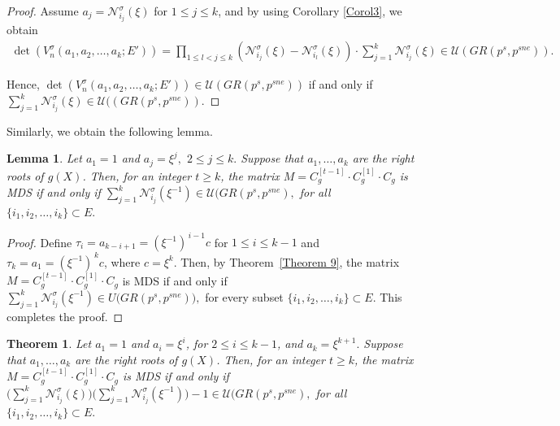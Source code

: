 \documentclass[11pt]{article}
\newtheorem{theorem}{Theorem}
\newtheorem{lemma}{Lemma}
\begin{document}
\begin{proof}
        Assume $a_{j}=\mathcal{N}^\sigma_{i_j}(\xi)$ for $1\leq j \leq k$, and by using Corollary \ref{Corol3}, we obtain 
        \begin{eqnarray*}
            \det( V^\sigma_n(a_1,a_2,\dots,a_k;E'))=\prod_{1\leq l<j\leq k}(\mathcal{N}^\sigma_{i_j}(\xi)- \mathcal{N}^\sigma_{i_l}(\xi))\cdot \sum_{j=1}^{k}\mathcal{N}^\sigma_{i_j}(\xi)\in \mathcal{U}(GR(p^s,p^{sne})).
        \end{eqnarray*}
        
        Hence, $\det( V^\sigma_n(a_1,a_2,\dots,a_k;E'))\in \mathcal{U}(GR(p^s,p^{sne}))$ if and only if $\sum_{j=1}^{k}\mathcal{N}^\sigma_{i_j}(\xi)\in \mathcal{U}((GR(p^s,p^{sne})).$
    \end{proof}
    
    Similarly, we obtain the following lemma.
    \begin{lemma}
        Let $a_1=1$ and $a_j=\xi^j,$ $2\leq j \leq k.$ Suppose that $a_1, \dots, a_k$ are the right roots of $g(X)$. Then, for an integer $t\geq k$, the matrix $
 	M = C^{[t-1]}_g \cdot C^{[1]}_g \cdot C_g
 	$ is MDS if and only if $\sum_{j=1}^{k}\mathcal{N}^\sigma_{i_j}(\xi^{-1}) \in \mathcal{U}(GR(p^s,p^{sne}),$ for all $\{i_1,i_2,\dots,i_k\}\subset E.$ 
    \end{lemma}
    \begin{proof}
       Define $\tau_i=a_{k-i+1}=(\xi^{-1})^{\,i-1}c$ for $1\leq i \leq k-1$ and $\tau_k=a_1=(\xi^{-1})^{\,k}c$, where $c=\xi^k$. Then, by Theorem~\ref{Theorem 9}, the matrix 
\(
M = C^{[t-1]}_g \cdot C^{[1]}_g \cdot C_g
\)
is MDS if and only if 
\(
\sum_{j=1}^{k} \mathcal{N}^\sigma_{i_j}(\xi^{-1})\in U\big(GR(p^s,p^{sne})\big),
\)
for every subset $\{i_1,i_2,\dots,i_k\}\subset E$. This completes the proof.
    \end{proof}
    \begin{theorem}
        Let $a_1=1$ and $a_i=\xi^i$, for $2\leq i \leq k-1$, and $a_k=\xi^{k+1}.$ Suppose that $a_1, \dots, a_k$ are the right roots of $g(X)$. Then, for an integer $t\geq k$, the matrix $
 	M = C^{[t-1]}_g \cdot C^{[1]}_g \cdot C_g
 	$ is MDS if and only if $\Big(\sum_{j=1}^{k}\mathcal{N}^\sigma_{i_j}(\xi)\Big)\Big(\sum_{j=1}^{k}\mathcal{N}^\sigma_{i_j}(\xi^{-1})\Big)-1\in \mathcal{U}(GR(p^s,p^{sne}),$ for all $\{i_1,i_2,\dots,i_k\}\subset E.$ 
    \end{theorem}
\end{document}
